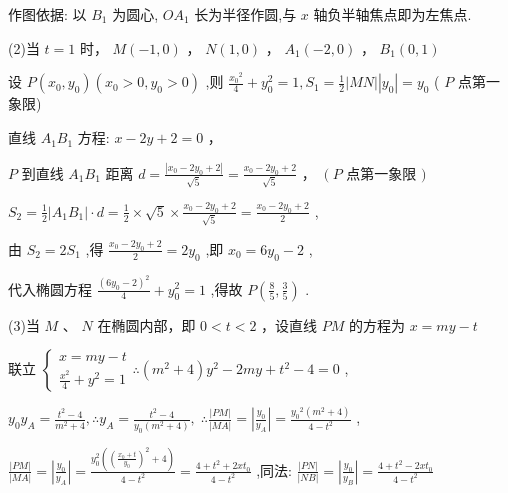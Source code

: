 \documentclass[10pt]{article}
\begin{document}
作图依据: 以 \({B}_{1}\) 为圆心, \(O{A}_{1}\) 长为半径作圆,与 \(x\) 轴负半轴焦点即为左焦点.

(2)当 \(t = 1\) 时， \(M\left( {-1,0}\right)\) ， \(N\left( {1,0}\right)\) ， \({A}_{1}\left( {-2,0}\right)\) ， \({B}_{1}\left( {0,1}\right)\)

设 \(P\left( {{x}_{0},{y}_{0}}\right) \left( {{x}_{0} > 0,{y}_{0} > 0}\right)\) ,则 \(\frac{{x}_{0}{}^{2}}{4} + {y}_{0}^{2} = 1,{S}_{1} = \frac{1}{2}\left| {MN}\right| \left| {y}_{0}\right|  = {y}_{0}\) ( \(P\) 点第一象限)

直线 \({A}_{1}{B}_{1}\) 方程: \(x - {2y} + 2 = 0\) ，

\(P\) 到直线 \({A}_{1}{B}_{1}\) 距离 \(d = \frac{\left| {x}_{0} - 2{y}_{0} + 2\right| }{\sqrt{5}} = \frac{{x}_{0} - 2{y}_{0} + 2}{\sqrt{5}}\) ， \(\left( P\right.\) 点第一象限 \()\)

\({S}_{2} = \frac{1}{2}\left| {{A}_{1}{B}_{1}}\right|  \cdot  d = \frac{1}{2} \times  \sqrt{5} \times  \frac{{x}_{0} - 2{y}_{0} + 2}{\sqrt{5}} = \frac{{x}_{0} - 2{y}_{0} + 2}{2}\) ,

由 \({S}_{2} = 2{S}_{1}\) ,得 \(\frac{{x}_{0} - 2{y}_{0} + 2}{2} = 2{y}_{0}\) ,即 \({x}_{0} = 6{y}_{0} - 2\) ,

代入椭圆方程 \(\frac{{\left( 6{y}_{0} - 2\right) }^{2}}{4} + {y}_{0}^{2} = 1\) ,得故 \(P\left( {\frac{8}{5},\frac{3}{5}}\right)\) .

(3)当 \(M\text{ 、 }N\) 在椭圆内部，即 \(0 < t < 2\) ，设直线 \({PM}\) 的方程为 \(x = {my} - t\)

联立 \(\left\{  {\begin{array}{l} x = {my} - t \\  \frac{{x}^{2}}{4} + {y}^{2} = 1 \end{array}\therefore \left( {{m}^{2} + 4}\right) {y}^{2} - {2my} + {t}^{2} - 4 = 0}\right.\) ,

\({y}_{0}{y}_{A} = \frac{{t}^{2} - 4}{{m}^{2} + 4},\therefore {y}_{A} = \frac{{t}^{2} - 4}{{y}_{0}\left( {{m}^{2} + 4}\right) },\;\therefore \frac{\left| PM\right| }{\left| MA\right| } = \left| \frac{{y}_{0}}{{y}_{A}}\right|  = \frac{{y}_{0}{}^{2}\left( {{m}^{2} + 4}\right) }{4 - {t}^{2}}\) ,

\(\frac{\left| PM\right| }{\left| MA\right| } = \left| \frac{{y}_{0}}{{y}_{A}}\right|  = \frac{{y}_{0}^{2}\left( {{\left( \frac{{x}_{0} + t}{{y}_{0}}\right) }^{2} + 4}\right) }{4 - {t}^{2}} = \frac{4 + {t}^{2} + {2x}{t}_{0}}{4 - {t}^{2}}\) ,同法: \(\frac{\left| PN\right| }{\left| NB\right| } = \left| \frac{{y}_{0}}{{y}_{B}}\right|  = \frac{4 + {t}^{2} - {2x}{t}_{0}}{4 - {t}^{2}}\)
\end{document}
